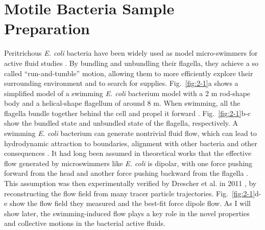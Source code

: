 \section{Motile Bacteria Sample Preparation}
\label{motile-bacteria-sample-preparation}
Peritrichous \textit{E. coli} bacteria have been widely used as model micro-swimmers for active fluid studies \cite{Poon2012, Schwarz-Linek2016}. By bundling and unbundling their flagella, they achieve a so called ``run-and-tumble'' motion, allowing them to more efficiently explore their surrounding environment and to search for supplies. Fig.~\ref{fig:2-1}a shows a simplified model of a swimming \textit{E. coli} bacterium model with a 2 \textmu m rod-shape body and a helical-shape flagellum of around 8 \textmu m. When swimming, all the flagella bundle together behind the cell and propel it forward \cite{Lauga2016}. Fig.~\ref{fig:2-1}b-c show the bundled state and unbundled state of the flagella, respectively. A swimming \textit{E. coli} bacterium can generate nontrivial fluid flow, which can lead to hydrodynamic attraction to boundaries, alignment with other bacteria and other consequences \cite{Elgeti2015}. It had long been assumed in theoretical works that the effective flow generated by microswimmers like \textit{E. coli} is dipolar, with one force pushing forward from the head and another force pushing backward from the flagella
\cite{Simha2002, Ishikawa2007, Saintillan2008a, Saintillan2008b}. This assumption was then experimentally verified by Drescher et al. in 2011 \cite{Drescher2011}, by reconstructing the flow field from many tracer particle trajectories. Fig.~\ref{fig:2-1}d-e show the flow field they measured and the best-fit force dipole flow. As I will show later, the swimming-induced flow plays a key role in the novel properties and collective motions in the bacterial active fluids.

